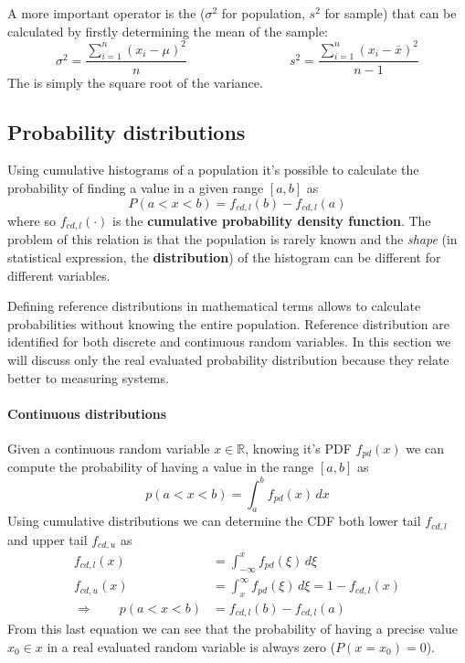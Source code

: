 	A more important operator is the  ($\sigma^2$ for population, $s^2$ for sample) that can be calculated by firstly determining the mean of the sample:
	\begin{equation}
		\sigma^2 = \frac{\sum_{i=1}^n (x_i-\mu)^2 }{n} \qquad \qquad \qquad \qquad s^2 = \frac{\sum_{i=1}^n (x_i-\overline x)^2 }{n-1}
	\end{equation}
	The  is simply the square root of the variance.
	
\subsection{Probability distributions}
	Using cumulative histograms of a population it's possible to calculate the probability of finding a value in a given range $[a,b]$ as
	\[ P(a<x<b) = f_{cd,l}(b)-f_{cd,l}(a) \]
	where so $f_{cd,l}(\cdot)$ is the \textbf{cumulative probability density function}. The problem of this relation is that the population is rarely known and the \textit{shape} (in statistical expression, the \textbf{distribution}) of the histogram can be different for different variables.
	
	Defining reference distributions in mathematical terms allows to calculate probabilities without knowing the entire population. Reference distribution are identified for both discrete and continuous random variables. In this section we will discuss only the real evaluated probability distribution because they relate better to measuring systems.
	
	\paragraph{Continuous distributions} Given a continuous random variable $x\in\mathds R$, knowing it's  PDF $f_{pd}(x)$ we can compute the probability of having a value in the range $[a,b]$ as
	\begin{equation}
		p(a<x<b) = \int_a^b f_{pd}(x)\, dx
	\end{equation}
	Using cumulative distributions we can determine the  CDF both lower tail $f_{cd,l}$ and upper tail $f_{cd,u}$ as
	\begin{equation}
	\begin{aligned}
		f_{cd,l}(x) & = \int_{-\infty}^x f_{pd}(\xi)\, d\xi \\
		f_{cd,u}(x) & = \int_x^\infty f_{pd}(\xi)\, d\xi = 1 - f_{cd,l}(x) \\
		\Rightarrow \qquad p(a<x<b) &= f_{cd,l}(b)-f_{cd,l}(a)
	\end{aligned}
	\end{equation}
	From this last equation we can see that the probability of having a precise value $x_0\in x$ in a real  evaluated random variable is always zero ($P(x=x_0) = 0$).
	
